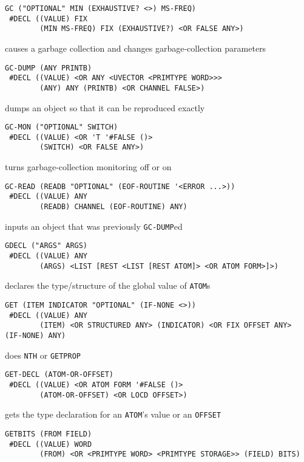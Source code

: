 \documentclass[a4paper]{scrbook}
\begin{document}
\begin{verbatim}
GC ("OPTIONAL" MIN (EXHAUSTIVE? <>) MS-FREQ)
 #DECL ((VALUE) FIX
        (MIN MS-FREQ) FIX (EXHAUSTIVE?) <OR FALSE ANY>)
\end{verbatim}

causes a garbage collection and changes garbage-collection parameters

\begin{verbatim}
GC-DUMP (ANY PRINTB)
 #DECL ((VALUE) <OR ANY <UVECTOR <PRIMTYPE WORD>>>
        (ANY) ANY (PRINTB) <OR CHANNEL FALSE>)
\end{verbatim}

dumps an object so that it can be reproduced exactly

\begin{verbatim}
GC-MON ("OPTIONAL" SWITCH)
 #DECL ((VALUE) <OR 'T '#FALSE ()>
        (SWITCH) <OR FALSE ANY>)
\end{verbatim}

turns garbage-collection monitoring off or on

\begin{verbatim}
GC-READ (READB "OPTIONAL" (EOF-ROUTINE '<ERROR ...>))
 #DECL ((VALUE) ANY
        (READB) CHANNEL (EOF-ROUTINE) ANY)
\end{verbatim}

inputs an object that was previously \texttt{GC-DUMP}ed

\begin{verbatim}
GDECL ("ARGS" ARGS)
 #DECL ((VALUE) ANY
        (ARGS) <LIST [REST <LIST [REST ATOM]> <OR ATOM FORM>]>)
\end{verbatim}

declares the type/structure of the global value of \texttt{ATOM}s

\begin{verbatim}
GET (ITEM INDICATOR "OPTIONAL" (IF-NONE <>))
 #DECL ((VALUE) ANY
        (ITEM) <OR STRUCTURED ANY> (INDICATOR) <OR FIX OFFSET ANY> (IF-NONE) ANY)
\end{verbatim}

does \texttt{NTH} or \texttt{GETPROP}

\begin{verbatim}
GET-DECL (ATOM-OR-OFFSET)
 #DECL ((VALUE) <OR ATOM FORM '#FALSE ()>
        (ATOM-OR-OFFSET) <OR LOCD OFFSET>)
\end{verbatim}

gets the type declaration for an \texttt{ATOM}'s value or an \texttt{OFFSET}

\begin{verbatim}
GETBITS (FROM FIELD)
 #DECL ((VALUE) WORD
        (FROM) <OR <PRIMTYPE WORD> <PRIMTYPE STORAGE>> (FIELD) BITS)
\end{verbatim}
\end{document}
